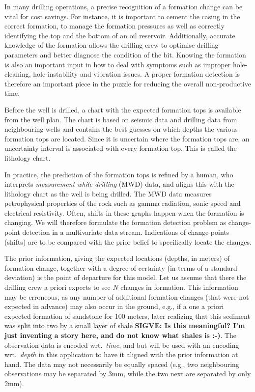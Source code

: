 In many drilling operations, a precise recognition of a formation change can be vital for cost savings. 
For instance, it is important to cement the casing in the correct formation, to manage the formation pressures as well as correctly identifying the top and the bottom of an oil reservoir. 
Additionally, accurate knowledge of the formation allows the drilling crew to optimise drilling parameters and better diagnose the condition of the bit. 
Knowing the formation is also an important input in how to deal with symptoms such as improper hole-cleaning, hole-instability and vibration issues. 
A proper formation detection is therefore an important piece in the puzzle for reducing the overall non-productive time.

Before the well is drilled, a chart with the expected formation tops is available from the well plan. The chart is based on seismic data and drilling data from neighbouring wells and contains the best guesses on which depths the various formation tops are located. Since it is uncertain where the formation tops are, an uncertainty interval is associated with every formation top. This is called the lithology chart.

In practice, the prediction of the formation tops is refined by a human, who interprets  {\em measurement while drilling} (MWD) data, and aligns this with the lithology chart as the well is being drilled. 
The MWD data measures petrophysical properties of the rock such as gamma radiation, sonic speed and electrical resistivity. 
Often, shifts in these graphs happen when the formation is changing. We will therefore formulate the formation detection problem as change-point detection in a multivariate data stream. 
Indications of change-points (shifts) are to be compared with the prior belief to specifically locate the changes. 

The prior information, giving the expected locations (depths, in meters) of formation change, together with a degree of certainty (in terms of a standard deviation) is the point of departure for this model. Let us assume that there the drilling crew a priori expects  to see $N$ changes in formation. 
This information may be erroneous, as any number of additional formation-changes (that were not expected in advance) may also occur in the ground, e.g., if a one a priori expected formation of sandstone for 100 meters, later realizing that this sediment was split into two by a small layer of shale {\bf SIGVE: Is this meaningful? I'm just inventing a story here, and do not know what shales is :-)}.
The observation data is encoded wrt.\ \textit{time}, and but will be used with an encoding wrt.\ \textit{depth} in this application to have it aligned with the prior information at hand. The data may not necessarily be equally spaced (e.g., two neighbouring observations may be separated by 3mm, while the two next are separated by only 2mm). 
 

